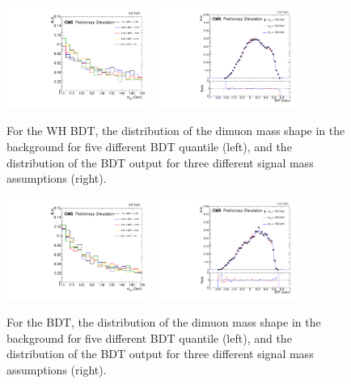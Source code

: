 \begin{figure}[!htb]
  \centering
  \captionsetup{justification=justified}
  \includegraphics[width=0.42\textwidth]{pics/VH_sec/valid_BDT_WH/mass_in_WH_BDT_quantiles.pdf}
  \includegraphics[width=0.42\textwidth]{pics/VH_sec/valid_BDT_WH/WH_BDT_three_sigs.pdf}
  \caption{For the WH BDT, the distribution of the dimuon mass shape in the background for five different BDT quantile (left), 
           and the distribution of the BDT output for three different signal mass assumptions (right).}
  \label{fig:wh_bdt_mass}
\end{figure}

\begin{figure}[!htb]
  \centering
  \captionsetup{justification=justified}
  \includegraphics[width=0.42\textwidth]{pics/VH_sec/valid_BDT_ZH/mass_in_ZH_BDT_quantiles.pdf}
  \includegraphics[width=0.42\textwidth]{pics/VH_sec/valid_BDT_ZH/ZH_BDT_three_sigs.pdf}
  \caption{For the \ZH BDT, the distribution of the dimuon mass shape in the background for five different BDT quantile (left),
           and the distribution of the BDT output for three different signal mass assumptions (right).}
  \label{fig:zh_bdt_mass}
\end{figure}


